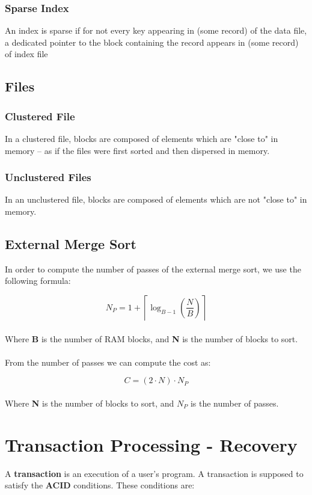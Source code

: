 \documentclass{article}
\begin{document}
\subsubsection{Sparse Index}
An index is sparse if for not every key appearing in (some record) of the data file, a dedicated pointer to the block containing the record appears in (some record) of index file

\subsection{Files}
\subsubsection{Clustered File}
In a clustered file, blocks are composed of elements which are "close to" in memory -- as if the files were first sorted and then dispersed in memory.

\subsubsection{Unclustered Files}
In an unclustered file, blocks are composed of elements which are not "close to" in memory.

\subsection{External Merge Sort}
In order to compute the number of passes of the external merge sort, we use the following formula:

\[ N_P = 1 + \left\lceil \log_{B-1}\left(\frac{N}{B}\right) \right\rceil \] \\
Where \textbf{B} is the number of RAM blocks, and \textbf{N} is the number of blocks to sort. \\ \\
From the number of passes we can compute the cost as:

\[ C = (2 \cdot N) \cdot N_P \] \\
Where \textbf{N} is the number of blocks to sort, and $N_P$ is the number of passes.

\section{Transaction Processing - Recovery}
A \textbf{transaction} is an execution of a user's program. A transaction is supposed to satisfy the \textbf{ACID} conditions. These conditions are:
\end{document}
